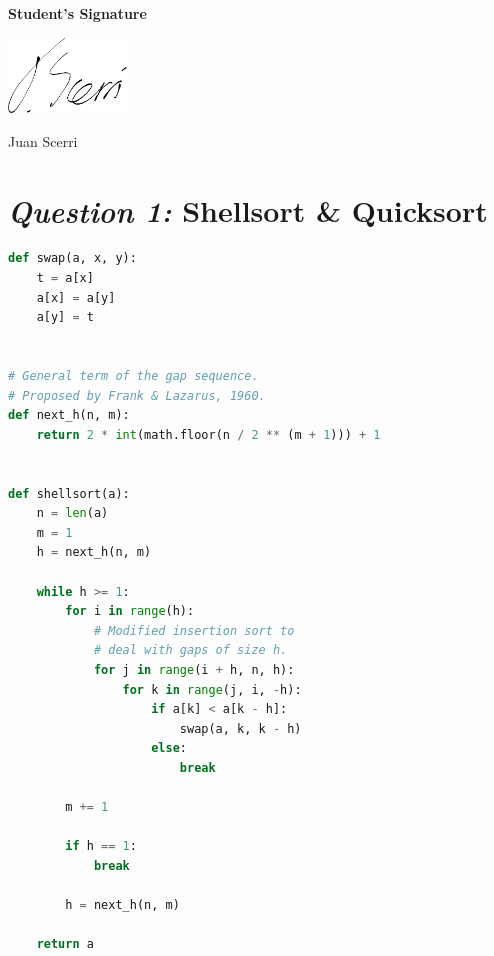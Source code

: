 \documentclass[12pt]{article}
\begin{document}
\textbf{Student's Signature} \medskip

\underline{\includegraphics[height=2cm]{sig}} \medskip

Juan Scerri

\section{\textit{Question 1:} Shellsort \& Quicksort}

\begin{lstlisting}[caption={Shellsort implementation},language=Python]
def swap(a, x, y):
    t = a[x]
    a[x] = a[y]
    a[y] = t


# General term of the gap sequence.
# Proposed by Frank & Lazarus, 1960.
def next_h(n, m):
    return 2 * int(math.floor(n / 2 ** (m + 1))) + 1


def shellsort(a):
    n = len(a)
    m = 1
    h = next_h(n, m)

    while h >= 1:
        for i in range(h):
            # Modified insertion sort to
            # deal with gaps of size h.
            for j in range(i + h, n, h):
                for k in range(j, i, -h):
                    if a[k] < a[k - h]:
                        swap(a, k, k - h)
                    else:
                        break

        m += 1

        if h == 1:
            break

        h = next_h(n, m)

    return a
\end{lstlisting}

\pagebreak
\end{document}
